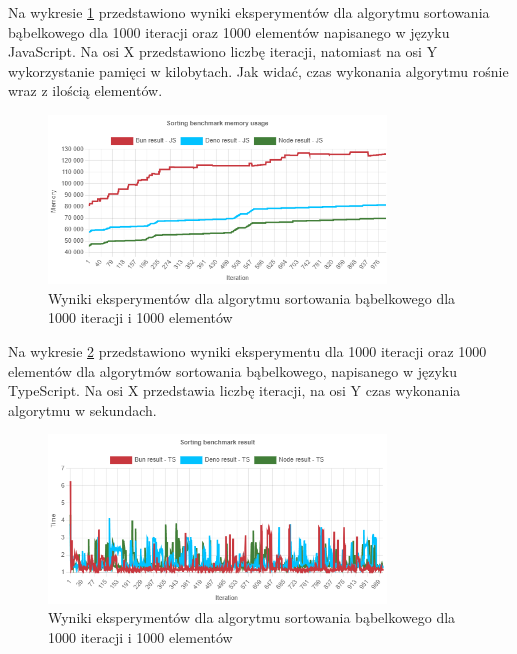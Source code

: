 Na wykresie \ref{fig:quick_sorting_e3_memory_js} przedstawiono wyniki eksperymentów dla algorytmu sortowania bąbelkowego dla 1000 iteracji oraz 1000 elementów napisanego w języku JavaScript. Na osi X przedstawiono liczbę iteracji, natomiast na osi Y wykorzystanie pamięci w kilobytach. Jak widać, czas wykonania algorytmu rośnie wraz z ilością elementów.
\begin{figure}[H]
  \centering
  \includegraphics[width=0.8\textwidth]{Figures/sorting/quick/e3_memory_js.png}
  \caption{Wyniki eksperymentów dla algorytmu sortowania bąbelkowego dla 1000 iteracji i 1000 elementów}
  \label{fig:quick_sorting_e3_memory_js}
\end{figure}

Na wykresie \ref{fig:quick_sorting_e3_ts} przedstawiono wyniki eksperymentu dla 1000 iteracji oraz 1000 elementów dla algorytmów sortowania bąbelkowego, napisanego w języku TypeScript. Na osi X przedstawia liczbę iteracji, na osi Y czas wykonania algorytmu w sekundach. 

\begin{figure}[H]
  \centering
  \includegraphics[width=0.8\textwidth]{Figures/sorting/quick/e3_ts.png}
  \caption{Wyniki eksperymentów dla algorytmu sortowania bąbelkowego dla 1000 iteracji i 1000 elementów}
  \label{fig:quick_sorting_e3_ts}
\end{figure}

